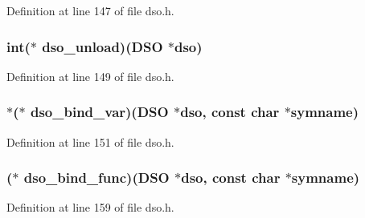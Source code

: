 Definition at line 147 of file dso.\+h.

\subsubsection[{\texorpdfstring{dso\+\_\+unload}{dso_unload}}]{\setlength{\rightskip}{0pt plus 5cm}int($\ast$ dso\+\_\+unload)({\bf D\+SO} $\ast$dso)}\hypertarget{structdso__meth__st_a103e03b8763dabecf427674af876b894}{}\label{structdso__meth__st_a103e03b8763dabecf427674af876b894}


Definition at line 149 of file dso.\+h.

\subsubsection[{\texorpdfstring{dso\+\_\+bind\+\_\+var}{dso_bind_var}}]{ $\ast$($\ast$ dso\+\_\+bind\+\_\+var)({\bf D\+SO} $\ast$dso, const char $\ast$symname)}\hypertarget{structdso__meth__st_a147a776efa0a8cdfcccd56cc31f26066}{}\label{structdso__meth__st_a147a776efa0a8cdfcccd56cc31f26066}


Definition at line 151 of file dso.\+h.

\subsubsection[{\texorpdfstring{dso\+\_\+bind\+\_\+func}{dso_bind_func}}]{($\ast$ dso\+\_\+bind\+\_\+func)({\bf D\+SO} $\ast$dso, const char $\ast$symname)}\hypertarget{structdso__meth__st_af9fdcd8f7c937e657733860bfcdbfe32}{}\label{structdso__meth__st_af9fdcd8f7c937e657733860bfcdbfe32}


Definition at line 159 of file dso.\+h.

